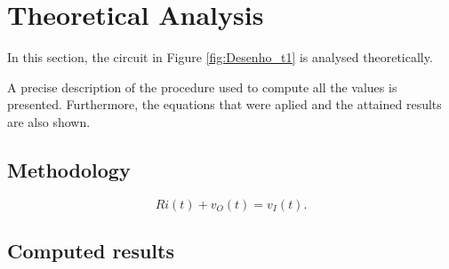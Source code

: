 \section{Theoretical Analysis}
\label{sec:analysis}



In this section, the circuit in Figure \ref{fig:Desenho_t1} is analysed theoretically.

A precise description of the procedure used to compute all the values is presented.
Furthermore, the equations that were aplied and the attained results are also shown.




\subsection{Methodology}




\begin{equation}
	Ri(t) + v_O(t) = v_I(t).
	\label{eq:kvl}
\end{equation}




\subsection{Computed results}
\label{subsec:res_ana}


